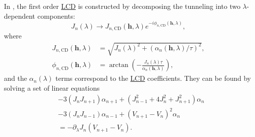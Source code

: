 \documentclass[a4paper,oneside,11pt]{book}
\newcommand{\hbb}{\boldsymbol{h}}
\newcommand{\acrref}[1]{\hyperref[acr:#1]{#1}}
\begin{document}
In \cite{meier_counterdiabatic_2020}, the first order \acrref{LCD} is constructed by decomposing the tunneling into two $\lambda$-dependent components:
\begin{equation}\label{eq:tunneling}
    J_n(\lambda) \rightarrow J_{n, \mathrm{CD}}(\hbb, \lambda) e^{-i\phi_{n, \mathrm{CD}}(\hbb, \lambda)},
\end{equation}
where
\begin{equation}\label{eq:J_cd}
    \begin{aligned}
    J_{n, \mathrm{CD}}(\hbb, \lambda) &= \sqrt{J_n(\lambda)^2 + (\alpha_n(\hbb, \lambda)/\tau)^2}, \\
    \phi_{n, \mathrm{CD}}(\hbb, \lambda)  &= \arctan\left(-\frac{J_n(\lambda)\tau}{\alpha_n(\hbb, \lambda)}\right),
    \end{aligned}
\end{equation}
and the $\alpha_n(\lambda)$ terms correspond to the \acrref{LCD} coefficients. They can be found by solving a set of linear equations
\begin{equation}
    \begin{aligned}
        &-3(J_n J_{n+1})\alpha_{n+1} + (J_{n-1}^2 + 4J^2_n + J_{n+1}^2)\alpha_n \\ &- 3(J_n J_{n-1})\alpha_{n-1} + (V_{n+1} - V_n)^2 \alpha_n \\ &= -\partial_{\lambda}J_n (V_{n+1} - V_{n}).
    \end{aligned}
\end{equation}
\end{document}
